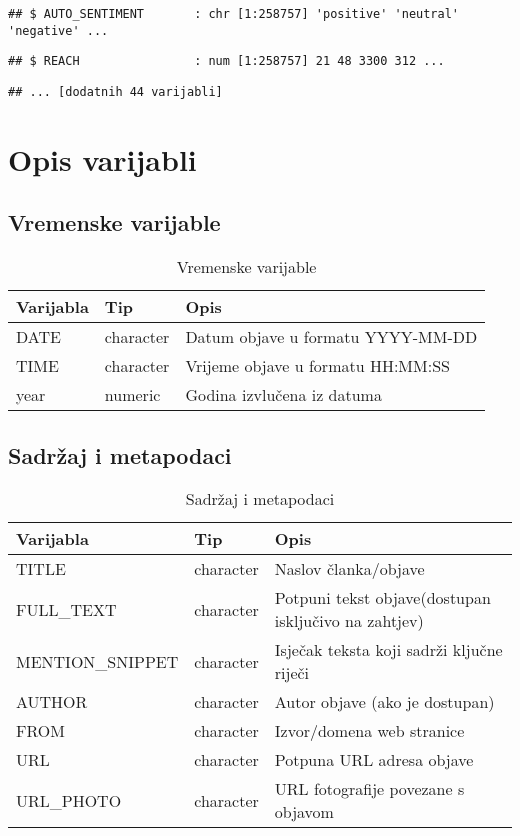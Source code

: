 \documentclass[
]{article}
\begin{document}
\begin{verbatim}
## $ AUTO_SENTIMENT       : chr [1:258757] 'positive' 'neutral' 'negative' ...
\end{verbatim}

\begin{verbatim}
## $ REACH                : num [1:258757] 21 48 3300 312 ...
\end{verbatim}

\begin{verbatim}
## ... [dodatnih 44 varijabli]
\end{verbatim}

\section{Opis varijabli}\label{opis-varijabli}

\subsection{Vremenske varijable}\label{vremenske-varijable}

\begin{longtable}[t]{lll}
\caption{\label{tab:temporal-vars}Vremenske varijable}\\
\toprule
Varijabla & Tip & Opis\\
\midrule
DATE & character & Datum objave u formatu YYYY-MM-DD\\
TIME & character & Vrijeme objave u formatu HH:MM:SS\\
year & numeric & Godina izvlučena iz datuma\\
\bottomrule
\end{longtable}

\subsection{Sadržaj i metapodaci}\label{sadrux17eaj-i-metapodaci}

\begin{longtable}[t]{lll}
\caption{\label{tab:content-vars}Sadržaj i metapodaci}\\
\toprule
Varijabla & Tip & Opis\\
\midrule
TITLE & character & Naslov članka/objave\\
FULL\_TEXT & character & Potpuni tekst objave(dostupan isključivo na zahtjev)\\
MENTION\_SNIPPET & character & Isječak teksta koji sadrži ključne riječi\\
AUTHOR & character & Autor objave (ako je dostupan)\\
FROM & character & Izvor/domena web stranice\\
\addlinespace
URL & character & Potpuna URL adresa objave\\
URL\_PHOTO & character & URL fotografije povezane s objavom\\
\bottomrule
\end{longtable}
\end{document}
